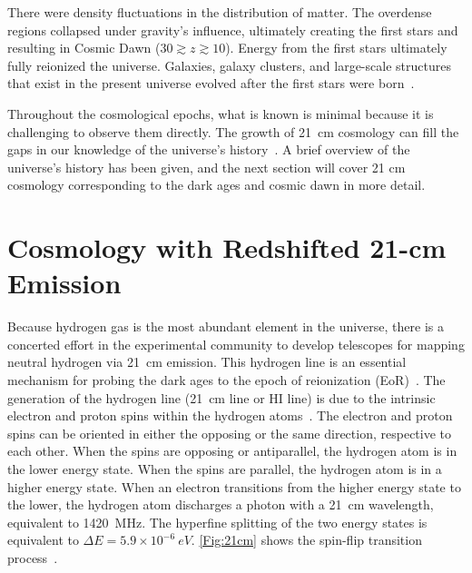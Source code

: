 There were density fluctuations in the distribution of matter. The overdense regions collapsed under gravity's influence, ultimately creating the first stars and resulting in Cosmic Dawn ($30\gtrsim z \gtrsim 10$). Energy from the first stars ultimately fully reionized the universe. Galaxies, galaxy clusters, and large-scale structures that exist in the present universe evolved after the first stars were born~\citep{2017arXiv170808521D, 2012AdSpR..49..433B}. 

Throughout the cosmological epochs, what is known is minimal because it is challenging to observe them directly. The growth of \SI{21}{cm} cosmology can fill the gaps in our knowledge of the universe's history~\citep{2012RPPh...75h6901P}. A brief overview of the universe's history has been given, and the next section will cover 21 cm cosmology corresponding to the dark ages and cosmic dawn in more detail.

\section{Cosmology with Redshifted 21-cm Emission}

Because hydrogen gas is the most abundant element in the universe, there is a concerted effort in the experimental community to develop telescopes for mapping neutral hydrogen via \SI{21}{cm} emission. This hydrogen line is an essential mechanism for probing the dark ages to the epoch of reionization (EoR)~\citep{2013PhRvD..87d3002L,2014ApJ...782...66P}. The generation of the hydrogen line (\SI{21}{cm} line or HI line) is due to the intrinsic electron and proton spins within the hydrogen atoms~\citep{book:832129}. The electron and proton spins can be oriented in either the opposing or the same direction, respective to each other. When the spins are opposing or antiparallel, the hydrogen atom is in the lower energy state. When the spins are parallel, the hydrogen atom is in a higher energy state. When an electron transitions from the higher energy state to the lower, the hydrogen atom discharges a photon with a \SI{21}{cm} wavelength, equivalent to \SI{1420}{MHz}. The hyperfine splitting of the two energy states is equivalent to \(\Delta E =  5.9 \times 10^{-6} \ eV\). \autoref{Fig:21cm} shows the spin-flip transition process~\citep{16, book:832129}.

